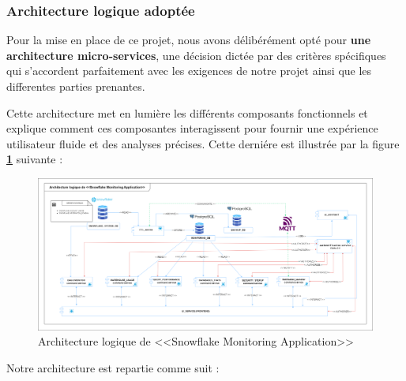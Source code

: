 \subsubsection{Architecture logique adoptée} 
\par Pour la mise en place de ce projet, nous avons délibérément opté pour \textbf{une architecture micro-services}, une décision dictée par des critères spécifiques qui s'accordent parfaitement avec les exigences
de notre projet ainsi que les differentes parties prenantes.
\par Cette architecture met en lumière les différents composants fonctionnels et explique comment ces composantes interagissent pour fournir une expérience utilisateur fluide et des analyses précises\cite{archi_log}. 
Cette derniére est illustrée par la figure \textbf{\ref{fig :arch_log}} suivante  :
        \begin{figure}[H]
        \centering
        \includegraphics[width = 1\linewidth]{img/conception/archi.png}
        \caption{Architecture logique de <<Snowflake Monitoring Application>>}
    \label{fig :arch_log}
        \end{figure}
    \par Notre architecture est repartie comme suit : 
